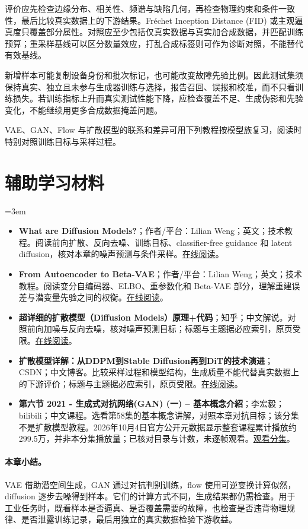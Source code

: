 评价应先检查边缘分布、相关性、频谱与缺陷几何，再检查物理约束和条件一致性，最后比较真实数据上的下游结果。Fréchet Inception Distance (FID) 或主观逼真度只覆盖部分属性。对照应至少包括仅真实数据与真实加合成数据，并匹配训练预算；重采样基线可以区分数量效应，打乱合成标签则可作为诊断对照，不能替代有效基线。

新增样本可能复制设备身份和批次标记，也可能改变故障先验比例。因此测试集须保持真实、独立且未参与生成器训练与选择，报告召回、误报和校准，而不只看训练损失。若训练指标上升而真实测试性能下降，应检查覆盖不足、生成伪影和先验变化，不能继续用更多合成数据掩盖问题。

VAE、GAN、Flow 与扩散模型的联系和差异可用下列教程按模型族复习，阅读时特别对照训练目标与采样过程。
\section*{辅助学习材料}
\begingroup
\emergencystretch=3em
\begin{itemize}
\item \textbf{What are Diffusion Models?}；作者/平台：Lilian Weng；英文；技术教程。阅读前向扩散、反向去噪、训练目标、classifier-free guidance 和 latent diffusion，核对本章的噪声预测与条件采样。\href{https://lilianweng.github.io/posts/2021-07-11-diffusion-models/}{在线阅读}。
\item \textbf{From Autoencoder to Beta-VAE}；作者/平台：Lilian Weng；英文；技术教程。阅读变分自编码器、ELBO、重参数化和 Beta-VAE 部分，理解重建误差与潜变量先验之间的权衡。\href{https://lilianweng.github.io/posts/2018-08-12-vae/}{在线阅读}。
\item \textbf{超详细的扩散模型（Diffusion Models）原理+代码}；知乎；中文解说。对照前向加噪与反向去噪，核对噪声预测目标；标题与主题据必应索引，原页受限。\href{https://zhuanlan.zhihu.com/p/624221952}{在线阅读}。
\item \textbf{扩散模型详解：从DDPM到Stable Diffusion再到DiT的技术演进}；CSDN；中文博客。比较采样过程和模型结构，生成质量不能代替真实数据上的下游评价；标题与主题据必应索引，原页受限。\href{https://blog.csdn.net/weixin\_67327688/article/details/155781843}{在线阅读}。
\item \textbf{第六节 2021 - 生成式对抗网络(GAN) (一) – 基本概念介紹}；李宏毅；bilibili；中文课程。选看第58集的基本概念讲解，对照本章对抗目标；该分集不是扩散模型教程。2026年10月4日官方公开元数据显示整套课程累计播放约299.5万，并非本分集播放量；已核对目录与计数，未逐帧观看。\href{https://www.bilibili.com/video/BV1Wv411h7kN/?p=58}{观看分集}。
\end{itemize}
\endgroup
\paragraph{本章小结。}
VAE 借助潜空间生成，GAN 通过对抗判别训练，flow 使用可逆变换计算似然，diffusion 逐步去噪得到样本。它们的计算方式不同，生成结果都仍需检查。用于工业任务时，既看样本是否逼真、是否覆盖需要的故障，也检查是否违背物理规律、是否泄露训练记录，最后用独立的真实数据检验下游收益。
